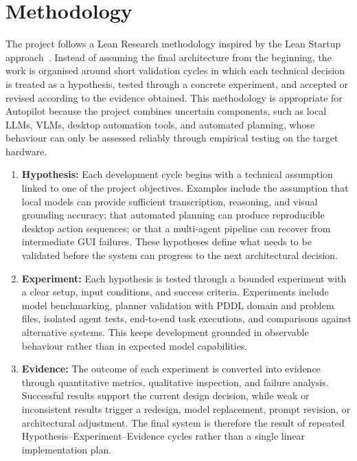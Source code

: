 \section{Methodology}
\label{sec:methodology}

The project follows a Lean Research methodology inspired by the Lean Startup approach~\cite{Ries2011}. Instead of assuming the final architecture from the beginning, the work is organised around short validation cycles in which each technical decision is treated as a hypothesis, tested through a concrete experiment, and accepted or revised according to the evidence obtained. This methodology is appropriate for Autopilot because the project combines uncertain components, such as local LLMs, VLMs, desktop automation tools, and automated planning, whose behaviour can only be assessed reliably through empirical testing on the target hardware.

\begin{enumerate}
  \item \textbf{Hypothesis:} Each development cycle begins with a technical assumption linked to one of the project objectives. Examples include the assumption that local models can provide sufficient transcription, reasoning, and visual grounding accuracy; that automated planning can produce reproducible desktop action sequences; or that a multi-agent pipeline can recover from intermediate GUI failures. These hypotheses define what needs to be validated before the system can progress to the next architectural decision.

  \item \textbf{Experiment:} Each hypothesis is tested through a bounded experiment with a clear setup, input conditions, and success criteria. Experiments include model benchmarking, planner validation with PDDL domain and problem files, isolated agent tests, end-to-end task executions, and comparisons against alternative systems. This keeps development grounded in observable behaviour rather than in expected model capabilities.

  \item \textbf{Evidence:} The outcome of each experiment is converted into evidence through quantitative metrics, qualitative inspection, and failure analysis. Successful results support the current design decision, while weak or inconsistent results trigger a redesign, model replacement, prompt revision, or architectural adjustment. The final system is therefore the result of repeated Hypothesis--Experiment--Evidence cycles rather than a single linear implementation plan.
\end{enumerate}


